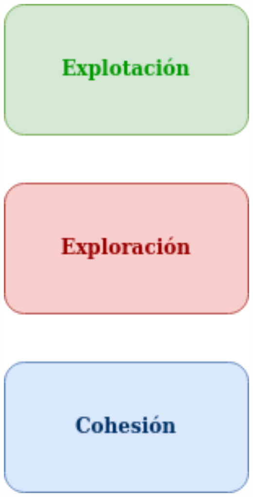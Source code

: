 \documentclass[
  24pt, %
  aspectratio=169, %
]{beamer}
\begin{document}
\begin{frame}
\begin{minipage}{0.2\textwidth}
    \includegraphics[width=1\textwidth]{estrategia}
  \end{minipage}
  
\end{frame}
\end{document}
